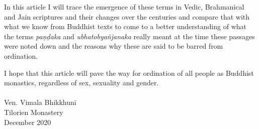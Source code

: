 In this article I will trace the emergence of these terms in Vedic, Brahmanical and Jain scriptures and their changes over the centuries and compare that with what we know from Buddhist texts to come to a better understanding of what the terms {\em paṇḍaka} and {\em ubhatob­yañ­janaka} really meant at the time these passages were noted down and the reasons why these are said to be barred from ordination.

I hope that this article will pave the way for ordination of all people as Buddhist monastics, regardless of sex, sexuality and gender.\\\\
Ven. Vimala Bhikkhunī\\
Tilorien Monastery\\
December 2020\\